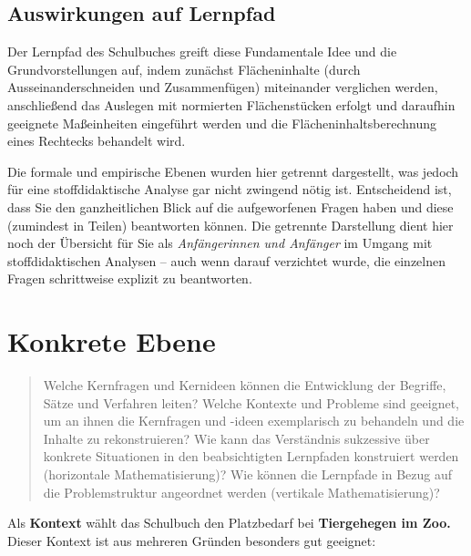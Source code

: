 \documentclass[
]{scrbook}
\theoremstyle{definition}
\theoremstyle{definition}
\theoremstyle{definition}
\theoremstyle{definition}
\theoremstyle{remark}
\begin{document}
\hypertarget{auswirkungen-auf-lernpfad}{%
\subsection{Auswirkungen auf Lernpfad}\label{auswirkungen-auf-lernpfad}}

Der Lernpfad des Schulbuches greift diese Fundamentale Idee und die Grundvorstellungen auf, indem zunächst Flächeninhalte (durch Ausseinanderschneiden und Zusammenfügen) miteinander verglichen werden, anschließend das Auslegen mit normierten Flächenstücken erfolgt und daraufhin geeignete Maßeinheiten eingeführt werden und die Flächeninhaltsberechnung eines Rechtecks behandelt wird.

Die formale und empirische Ebenen wurden hier getrennt dargestellt, was jedoch für eine stoffdidaktische Analyse gar nicht zwingend nötig ist. Entscheidend ist, dass Sie den ganzheitlichen Blick auf die aufgeworfenen Fragen haben und diese (zumindest in Teilen) beantworten können. Die getrennte Darstellung dient hier noch der Übersicht für Sie als \emph{Anfängerinnen und Anfänger} im Umgang mit stoffdidaktischen Analysen -- auch wenn darauf verzichtet wurde, die einzelnen Fragen schrittweise explizit zu beantworten.

\hypertarget{konkrete-ebene-1}{%
\section{Konkrete Ebene}\label{konkrete-ebene-1}}

\begin{quote}
Welche Kernfragen und Kernideen können die Entwicklung der Begriffe, Sätze und Verfahren leiten?
Welche Kontexte und Probleme sind geeignet, um an ihnen die Kernfragen und -ideen exemplarisch zu behandeln und die Inhalte zu rekonstruieren?
Wie kann das Verständnis sukzessive über konkrete Situationen in den beabsichtigten Lernpfaden konstruiert werden (horizontale Mathematisierung)?
Wie können die Lernpfade in Bezug auf die Problemstruktur angeordnet werden (vertikale Mathematisierung)?
\end{quote}

Als \textbf{Kontext} wählt das Schulbuch den Platzbedarf bei \textbf{Tiergehegen im Zoo.} Dieser Kontext ist aus mehreren Gründen besonders gut geeignet:
\end{document}
